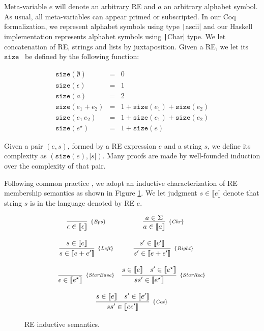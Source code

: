 \documentclass[oneside,12pt]{scrbook}
\newcommand{\haskell}[1]{\texttt|#1|}
\theoremstyle{definition}
\newcommand{\Eps}{\textit{Eps}}
\newcommand{\Chr}{\textit{Chr}}
\newcommand{\Catt}{\textit{Cat}}
\newcommand{\Left}{\textit{Left}}
\newcommand{\Right}{\textit{Right}}
\newcommand{\StarBase}{\textit{StarBase}}
\newcommand{\StarRec}{\textit{StarRec}}
\newcommand{\sembrackets}[1]{\ensuremath{\llbracket #1 \rrbracket}}
\newcommand{\size}{\ensuremath{\texttt{size}}}
\newcommand{\coq}[1]{\texttt|#1|}
\theoremstyle{plain}
\theoremstyle{definition}
\begin{document}
Meta-variable $e$ will denote an arbitrary RE and $a$ an
arbitrary alphabet symbol. As usual, all meta-variables can appear primed or subscripted. In our Coq formalization, we represent alphabet symbols using type \coq{ascii} and our Haskell implementation represents alphabet symbols using \haskell{Char} type. We let concatenation
of RE, strings and lists by juxtaposition. Given a RE, we let its \size~ be defined by the following 
function:


\[
\begin{array}{lcl}
\size(\emptyset) & = & 0 \\
\size(\epsilon)  & = & 1 \\
\size(a)         & = & 2 \\
\size(e_1 + e_2) & = & 1 + \size(e_1) + \size(e_2)\\
\size(e_1\,e_2)  & = & 1 + \size(e_1) + \size(e_2)\\
\size(e ^\star)  & = & 1 + \size(e)
\end{array}
\]

Given a pair $(e,s)$, formed by a RE expression $e$ and a string $s$, we define its complexity as $(\size(e),|s|)$. Many proofs are made by well-founded induction over the complexity of that pair.

Following common practice \cite{Lopes2016,Ribeiro2017,Rathnayake2011}, we adopt an inductive
characterization of RE membership semantics as shown in Figure \ref{figure:resemantics}. We let judgment $s \in \sembrackets{e}$ denote
that string $s$ is in the language denoted by RE $e$.

\begin{figure}[h]
	\[
	\begin{array}{cc}
	\infer[_{\{\Eps\}}]
	{\epsilon \in \sembrackets{\epsilon}}{} &
	\infer[_{\{\Chr\}}]
	{a \in \sembrackets{a}}{a \in \Sigma} \\ \\
	\infer[_{\{\Left\}}]
	{s \in \sembrackets{e + e'}}{s \in \sembrackets{e}} &
	\infer[_{\{\Right\}}]
	{s' \in \sembrackets{e + e'}}{s' \in \sembrackets{e'}} \\ \\
	\infer[_{\{\StarBase\}}]
	{\epsilon \in \sembrackets{e^\star}}{} &
	\infer[_{\{\StarRec\}}]
	{ss' \in \sembrackets{e^\star}}
	{s \in \sembrackets{e} & s' \in \sembrackets{e^\star}} \\ \\
	\multicolumn{2}{c}{
		\infer[_{\{\Catt\}}]
		{ss' \in \sembrackets{ee'}}
		{s \in \sembrackets{e} & s' \in \sembrackets{e'}}
	} \\
	\end{array}
	\]
	\centering
	\caption{RE inductive semantics.}
	\label{figure:resemantics}
\end{figure}
\end{document}

